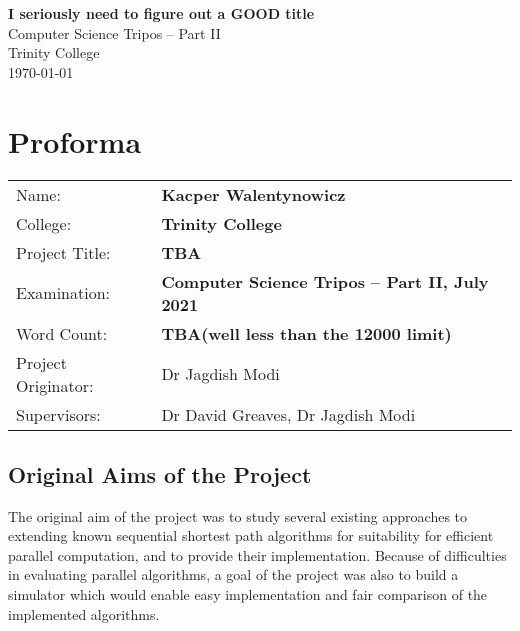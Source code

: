 \documentclass[12pt,a4paper,twoside,openright]{report}
\begin{document}
%




\pagestyle{empty}


\vspace*{60mm}
\begin{center}
\Huge
\textbf{I seriously need to figure out a GOOD title} \\[5mm]
Computer Science Tripos -- Part II \\[5mm]
Trinity College \\[5mm]
\today  %
\end{center}


\pagestyle{plain}

\chapter*{Proforma}

{\large
\begin{tabular}{ll}
Name:               & \bf Kacper Walentynowicz                       \\
College:            & \bf Trinity College                     \\
Project Title:      & \bf TBA \\
Examination:        & \bf Computer Science Tripos -- Part II, July 2021  \\
Word Count:         & \bf TBA\footnotemark[1]
                      (well less than the 12000 limit)  \\
Project Originator: & Dr Jagdish Modi                    \\
Supervisors:         & Dr David Greaves, Dr Jagdish Modi                     \\ 
\end{tabular}
}


\section*{Original Aims of the Project}

The original aim of the project was to study several existing approaches to extending known sequential shortest path algorithms for suitability for efficient parallel computation, and to provide their implementation. Because of difficulties in evaluating parallel algorithms, a goal of the project was also to build a simulator which would enable easy implementation and fair comparison of the implemented algorithms.
\end{document}
